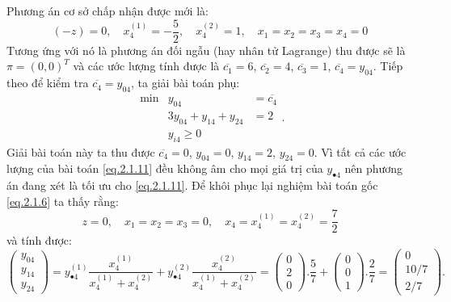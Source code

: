 Phương án cơ sở chấp nhận được mới là:
\begin{displaymath}
(-z)=0,\quad x^{(1)}_4=-\frac{5}{2},\quad x^{(2)}_4=1, \quad x_1=x_2=x_3=x_4=0
\end{displaymath}
Tương ứng với nó là phương án đối ngẫu (hay nhân tử Lagrange) thu được sẽ là $\pi=(0,0)^T$ và các ước lượng tính được là $\overline{c_1}=6$, $\overline{c_2}=4$, $\overline{c_3}=1$, $\overline{c_4}=y_{04}$. 
Tiếp theo để kiểm tra $\overline{c_4}=y_{04}$, ta giải bài toán phụ:
\begin{equation}\label{eq.2.1.12}
\begin{array}{lllll}
\min &y_{04}&=\overline{c_4}\\
&3y_{04}+y_{14}+y_{24}&=2\\
&y_{i4}\geq0\end{array} .
\end{equation}
Giải bài toán này ta thu được $\overline{c_4}=0$, $y_{04}=0$, $y_{14}=2$, $y_{24}=0$. Vì tất cả các ước lượng của bài toán \eqref{eq.2.1.11} đều không âm cho mọi giá trị của $y_{\bullet4}$ nên phương án đang xét là tối ưu cho \eqref{eq.2.1.11}. Để khôi phục lại nghiệm bài toán gốc \eqref{eq.2.1.6} ta thấy rằng:
\begin{displaymath}
z=0,\quad x_1=x_2=x_3=0,\quad x_4=x^{(1)}_4=x^{(2)}_4=\frac{7}{2}
\end{displaymath}
và tính được:
\begin{displaymath}
\left (\begin{matrix}y_{04}\\y_{14}\\y_{24}\end{matrix}\right )=y^{(1)}_{\bullet4}\frac{x^{(1)}_4}{x^{(1)}_4+x^{(2)}_4}+y^{(2)}_{\bullet4}\frac{x^{(2)}_4}{x^{(1)}_4+x^{(2)}_4}=\left(\begin{matrix}0\\2\\0\end{matrix}\right).\frac{5}{7}+\left(\begin{matrix}0\\0\\1\end{matrix}\right).\frac{2}{7}=\left(\begin{matrix}0\\10/7\\2/7\end{matrix}\right).
\end{displaymath}

